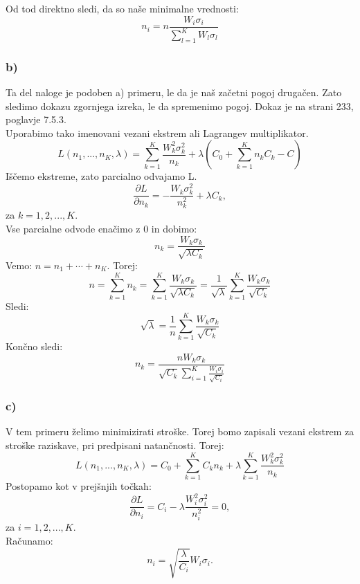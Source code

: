 \documentclass{article}
\begin{document}
Od tod direktno sledi, da so naše minimalne vrednosti:
\begin{equation*}
n_i = n \frac{W_i \sigma_i}{\sum_{l=1}^K W_l \sigma_l}
\end{equation*}


\subsubsection*{b)}
Ta del naloge je podoben a) primeru, le da je naš začetni pogoj drugačen. Zato sledimo dokazu zgornjega izreka, le da spremenimo pogoj. Dokaz je na strani 233, poglavje 7.5.3.\\
Uporabimo tako imenovani vezani ekstrem ali Lagrangev multiplikator.
\begin{equation*}
L(n_1,...,n_K, \lambda) = \sum_{k=1}^K \frac{W_k^2\sigma_k^2}{n_k} + \lambda \left(  C_0 + \sum_{k=1}^K n_k C_k - C\right)
\end{equation*}
Iščemo ekstreme, zato parcialno odvajamo L.
\begin{equation*}
\frac{\partial L}{\partial n_k} = -\frac{W_k\sigma^2_k}{n_k^2} + \lambda C_k,
\end{equation*}
za $k = 1,2,...,K$.\\
Vse parcialne odvode enačimo z 0 in dobimo:
\begin{equation*}
n_k = \frac{W_k\sigma_k}{\sqrt{\lambda C_k}}
\end{equation*}
Vemo: $n = n_1+\cdots + n_K$. Torej:
\begin{equation*}
n = \sum_{k=1}^K n_k = \sum_{k=1}^K \frac{W_k\sigma_k}{\sqrt{\lambda C_k}} = \frac{1}{\sqrt{\lambda}}\sum_{k=1}^K \frac{W_k\sigma_k}{\sqrt{C_k}}
\end{equation*}
Sledi:
\begin{equation*}
\sqrt{\lambda }=   \frac{1}{n} \sum_{k=1}^K \frac{W_k\sigma_k}{\sqrt{C_k}} 
\end{equation*}
Končno sledi:
\begin{equation*}
n_k = \frac{nW_k\sigma_k}{\sqrt{C_k}\sum_{i=1}^K \frac{W_i\sigma_i}{\sqrt{C_i}}}
\end{equation*}

\subsubsection*{c)}
V tem primeru želimo minimizirati stroške. Torej bomo zapisali vezani ekstrem za stroške raziskave, pri predpisani natančnosti. Torej:
\begin{equation*}
L(n_1,...,n_K,\lambda) = C_0 + \sum_{k=1}^KC_kn_k + \lambda  \sum_{k=1}^K \frac{W_k^2\sigma_k^2}{n_k}
\end{equation*}
Postopamo kot v prejšnjih točkah:
\begin{equation*}
\frac{\partial L}{\partial n_i} = C_i - \lambda \frac{W_i^2\sigma_i^2}{n_i^2} = 0,
\end{equation*}
za $i = 1,2,...,K$.\\
Računamo:
\begin{equation*}
n_i = \sqrt{\frac{\lambda}{C_i}} W_i \sigma_i.
\end{equation*}
\end{document}
